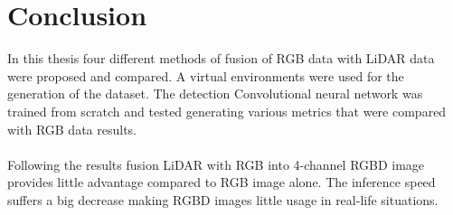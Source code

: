 \documentclass[twoside]{ctuthesis}
\theoremstyle{plain}
\theoremstyle{definition}
\theoremstyle{note}
\begin{document}
\chapter{Conclusion}
In this thesis four different methods of fusion of RGB data with LiDAR data were proposed and compared. A virtual environments were used for the generation of the dataset. The detection Convolutional neural network was trained from scratch and tested generating various metrics that were compared with RGB data results.\\
\\
Following the results fusion LiDAR with RGB into 4-channel RGBD image provides little advantage compared to RGB image alone. The inference speed suffers a big decrease making RGBD images little usage in real-life situations. 


\end{document}
